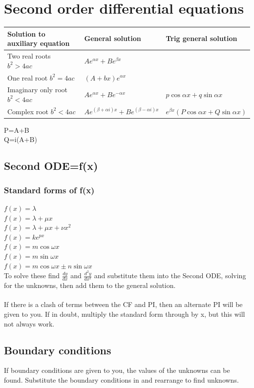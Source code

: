 \documentclass{article}[18pt]
\begin{document}
\section{Second order differential equations}
{\renewcommand{\arraystretch}{2}
\begin{tabularx}{\textwidth}{|X|X|X|}
\hline
\textbf{Solution to auxiliary equation}&\textbf{General solution}&\textbf{Trig general solution}\\
\hline
Two real roots $b^2>4ac$&$Ae^{\alpha x}+Be^{\beta x}$&\\
\hline
One real root $b^2=4ac$&$(A+bx)e^{\alpha x}$&\\
\hline
Imaginary only root $b^2<4ac$&$Ae^{\alpha x}+Be^{-\alpha x}$&
$p\cos\alpha x+q\sin\alpha x$
\\
\hline
Complex root $b^2<4ac$&$Ae^{(\beta+\alpha i)x}+Be^{(\beta-\alpha i)x}$&
$e^{\beta x}(P\cos\alpha x+Q\sin\alpha x)$
\\
\hline
\end{tabularx}}
P=A+B\\
Q=i(A+B)
\subsection{Second ODE=f(x)}
\subsubsection{Standard forms of f(x)}
$f(x)=\lambda$\\
$f(x)=\lambda+\mu x$\\
$f(x)=\lambda+\mu x+\nu x^2$\\
$f(x)=ke^{px}$\\
$f(x)=m\cos\omega x$\\
$f(x)=m\sin\omega x$\\
$f(x)=m\cos\omega x\pm n\sin\omega x$
\\
To solve these find $\frac{dy}{dx}$ and $\frac{d^2y}{dx^2}$ and substitute them into the Second ODE, solving for the unknowns, then add them to the general solution.\\
\\
If there is a clash of terms between the CF and PI, then an alternate PI will be given to you. If in doubt, multiply the standard form through by x, but this will not always work.
\subsection{Boundary conditions}
If boundary conditions are given to you, the values of the unknowns can be found. Substitute the boundary conditions in and rearrange to find unknowns.
\newpage
\end{document}
